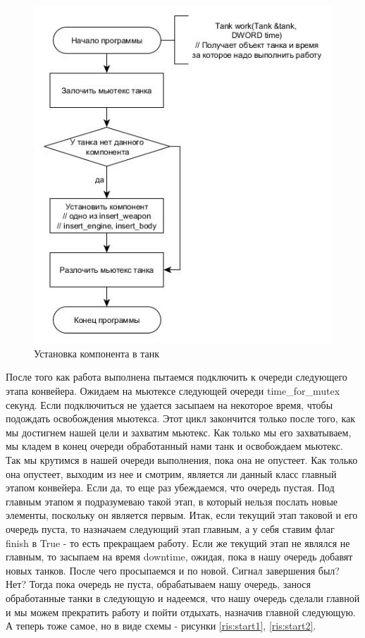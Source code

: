 \documentclass[a4paper, 14pt]{article}
\begin{document}
     \begin{figure}[h!]
    \center
    \includegraphics[scale=0.6]{component_thread.jpg}
    \caption{Установка компонента в танк}
    \label{ris:component}
    \end{figure}\newpage
    
    После того как работа выполнена пытаемся подключить к очереди следующего этапа конвейера. Ожидаем на мьютексе следующей очереди time\_for\_mutex секунд. Если подключиться не удается засыпаем на некоторое время, чтобы подождать освобождения мьютекса. Этот цикл закончится только после того, как мы достигнем нашей цели и захватим мьютекс. Как только мы его захватываем, мы кладем в конец очереди обработанный нами танк и освобождаем мьютекс. Так мы крутимся в нашей очереди выполнения, пока она не опустеет. Как только она опустеет, выходим из нее и смотрим, является ли данный класс главный этапом конвейера. Если да, то еще раз убеждаемся, что очередь пустая. Под главным этапом я подразумеваю такой этап, в который нельзя послать новые элементы, поскольку он является первым. Итак, если текущий этап таковой и его очередь пуста, то назначаем следующий этап главным, а у себя ставим флаг finish в True - то есть прекращаем работу. Если же текущий этап не являлся не главным, то засыпаем на время downtime, ожидая, пока в нашу очередь добавят новых танков. После чего просыпаемся и по новой. Сигнал завершения был? Нет? Тогда пока очередь не пуста, обрабатываем нашу очередь, занося обработанные танки в следующую и надеемся, что нашу очередь сделали главной и мы можем прекратить работу и пойти отдыхать, назначив главной следующую. А теперь тоже самое, но в виде схемы - рисунки \ref{ris:start1}, \ref{ris:start2}.
    
\end{document}

